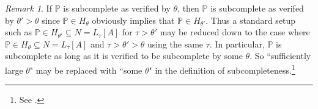 \documentclass{amsart}
\theoremstyle{definition}
\theoremstyle{remark}
\newtheorem{remark}[theorem]{Remark}
\renewcommand{\P}{\mathbb{P}}
\newcommand{\N}{{\overline{N}}}
\newcommand{\G}{\overline{G}}
\newcommand{\id}{\textup{\ensuremath{\text{id}}}}
\DeclareMathOperator{\ran}{range}
\newcommand{\rest}{\mathbin{\upharpoonright}}
\newcommand{\SH}{\mathcal{H}\textit{ull} \,}
\newcommand{\sk}[3]{\SH^{#1}( {#2} \cup {\ran(#3)} ) }
\newcommand{\Sk}[3]{\SH^{#1}( {#2} \cup {#3} ) }
\begin{document}
%

\begin{remark}\label{remark:VerifyingSC} If $\P$ is subcomplete as verified by $\theta$, then $\P$ is subcomplete as verifed by $\theta' > \theta$ since $\P \in H_\theta$ obviously implies that $\P \in H_{\theta'}$. Thus a standard setup such as $\P \in H_{\theta'} \subseteq N=L_\tau[A]$ for $\tau>\theta'$ may be reduced down to the case where $\P \in H_{\theta} \subseteq N=L_\tau[A]$ and $\tau>\theta'>\theta$ using the same $\tau$. 
In particular, $\P$ is subcomplete as long as it is verified to be subcomplete by some $\theta$. So ``sufficiently large $\theta$" may be replaced with ``some $\theta$" in the definition of subcompleteness.\footnote{See \cite[Section 3.1 Lemma 2.4]{Jensen:2012fr}.} \end{remark}
\end{document}
